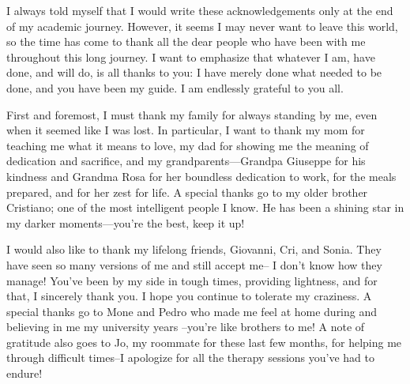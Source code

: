 I always told myself that I would write these acknowledgements only at the end of my academic journey.
 However, it seems I may never want to leave this world, 
 so the time has come to thank all the dear people who have been with me throughout this long journey. 
 I want to emphasize that whatever I am, have done, and will do, is all thanks to you: 
 I have merely done what needed to be done, and you have been my guide. 
 I am endlessly grateful to you all.

First and foremost, 
 I must thank my family for always standing by me, 
 even when it seemed like I was lost. 
 In particular, I want to thank my mom for teaching me what it means to love, 
 my dad for showing me the meaning of dedication and sacrifice, 
 and my grandparents—Grandpa Giuseppe for his kindness and Grandma Rosa for her boundless dedication to work, for the meals prepared, and for her zest for life. 
 A special thanks go to my older brother Cristiano; 
 one of the most intelligent people I know. 
 He has been a shining star in my darker moments—you're the best, keep it up!

I would also like to thank my lifelong friends, 
 Giovanni, Cri, and Sonia. 
 They have seen so many versions of me and still accept me--
 I don't know how they manage! 
 You've been by my side in tough times, providing lightness, and for that, I sincerely thank you. 
 I hope you continue to tolerate my craziness.
%
A special thanks go to Mone and Pedro who made me feel at home during and believing in me my university years --you're like brothers to me! 
%
A note of gratitude also goes to Jo, 
 my roommate for these last few months, 
 for helping me through difficult times--I apologize for all the therapy sessions you've had to endure!

